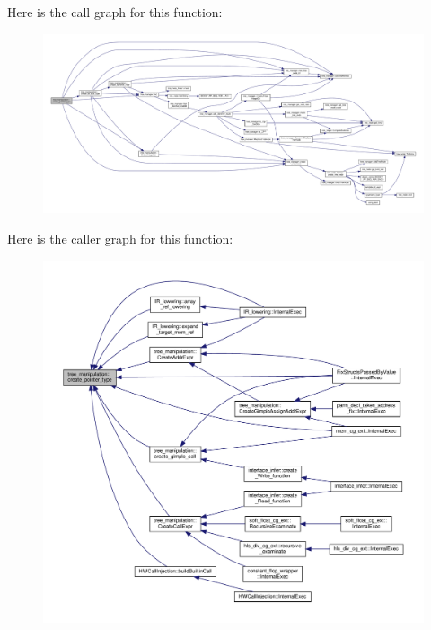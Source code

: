 Here is the call graph for this function\+:
\nopagebreak
\begin{figure}[H]
\begin{center}
\leavevmode
\includegraphics[width=350pt]{d0/d99/classtree__manipulation_a6d88570241f098107bc756f50011e3b4_cgraph}
\end{center}
\end{figure}
Here is the caller graph for this function\+:
\nopagebreak
\begin{figure}[H]
\begin{center}
\leavevmode
\includegraphics[width=350pt]{d0/d99/classtree__manipulation_a6d88570241f098107bc756f50011e3b4_icgraph}
\end{center}
\end{figure}
\mbox{\label{classtree__manipulation_aa9849e14cb81af9fc59f6e018cba6290}} 
